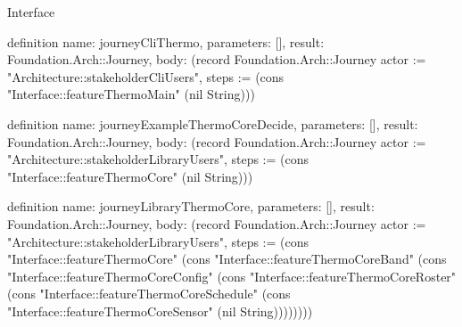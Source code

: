\begin{lexlean}{Interface}
\begin{semanticmodule}
definition{
  name: journeyCliThermo,
  parameters: [],
  result: Foundation.Arch::Journey,
  body: (record Foundation.Arch::Journey {actor := "Architecture::stakeholderCliUsers", steps := (cons "Interface::featureThermoMain" (nil String))})
}

definition{
  name: journeyExampleThermoCoreDecide,
  parameters: [],
  result: Foundation.Arch::Journey,
  body: (record Foundation.Arch::Journey {actor := "Architecture::stakeholderLibraryUsers", steps := (cons "Interface::featureThermoCore" (nil String))})
}

definition{
  name: journeyLibraryThermoCore,
  parameters: [],
  result: Foundation.Arch::Journey,
  body: (record Foundation.Arch::Journey {actor := "Architecture::stakeholderLibraryUsers", steps := (cons "Interface::featureThermoCore" (cons "Interface::featureThermoCoreBand" (cons "Interface::featureThermoCoreConfig" (cons "Interface::featureThermoCoreRoster" (cons "Interface::featureThermoCoreSchedule" (cons "Interface::featureThermoCoreSensor" (nil String)))))))})
}
\end{semanticmodule}
\end{lexlean}
